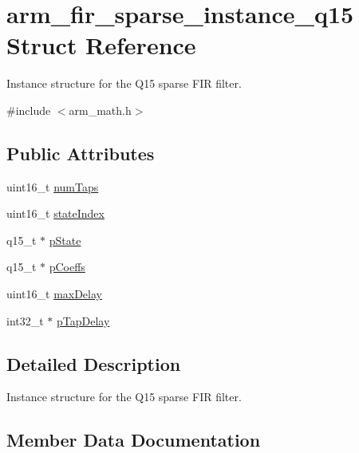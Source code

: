 \hypertarget{structarm__fir__sparse__instance__q15}{}\section{arm\+\_\+fir\+\_\+sparse\+\_\+instance\+\_\+q15 Struct Reference}
\label{structarm__fir__sparse__instance__q15}


Instance structure for the Q15 sparse F\+IR filter.  




{\ttfamily \#include $<$arm\+\_\+math.\+h$>$}

\subsection*{Public Attributes}
\begin{DoxyCompactItemize}
\item 
uint16\+\_\+t \hyperlink{structarm__fir__sparse__instance__q15_a0f66b126dd8b85f7467cfb01b7bc4d77}{num\+Taps}
\item 
uint16\+\_\+t \hyperlink{structarm__fir__sparse__instance__q15_a89487f28cab52637426024005e478985}{state\+Index}
\item 
q15\+\_\+t $\ast$ \hyperlink{structarm__fir__sparse__instance__q15_a98b92b0f5208110129b9a67b1db90408}{p\+State}
\item 
q15\+\_\+t $\ast$ \hyperlink{structarm__fir__sparse__instance__q15_a78a6565473b5f0b8c77c3f0f58a76069}{p\+Coeffs}
\item 
uint16\+\_\+t \hyperlink{structarm__fir__sparse__instance__q15_ad14cc1070eecf7e1926d8f67a8273182}{max\+Delay}
\item 
int32\+\_\+t $\ast$ \hyperlink{structarm__fir__sparse__instance__q15_aeab2855176c6efdb231a73a3672837d5}{p\+Tap\+Delay}
\end{DoxyCompactItemize}


\subsection{Detailed Description}
Instance structure for the Q15 sparse F\+IR filter. 

\subsection{Member Data Documentation}
